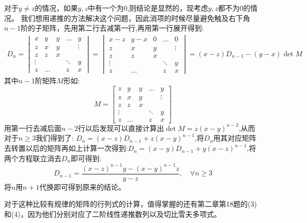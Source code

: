 \documentclass[a4paper,12pt]{ctexart}
\newenvironment{prooff}{{\noindent\it\textcolor{cyan!40!black}{Proof}:}\quad}{\par}
\begin{document}
\begin{prooff}
    对于$y\neq z$的情况，如果$y,z$中有一个为$0$,则结论是显然的，现考虑$y,z$都不为$0$的情况。
    我们想用递推的方法解决这个问题，因此消项的时候尽量避免触及右下角$n-1$阶的子矩阵，先用第二行去减第一行,再用第一行展开得到:
    \begin{align*}
        D_n=\begin{vmatrix}
            x      & y     & y & \dots  & y      \\
            z      & x     & y &        & \vdots \\
            z      & z     & x &        &        \\
            \vdots &       &   & \ddots & y      \\
            z      & \dots &   & z      & x
        \end{vmatrix}=\begin{vmatrix}
            x-z    & y-x   & 0 & \dots  & 0      \\
            z      & x     & y &        & \vdots \\
            z      & z     & x &        &        \\
            \vdots &       &   & \ddots & y      \\
            z      & \dots &   & z      & x
        \end{vmatrix}=(x-z)D_{n-1}-(y-x)\det M
    \end{align*}
    其中$n-1$阶矩阵$M$形如:
    \begin{equation*}
        M=\begin{bmatrix}
            z      & y     & y & \dots  & y      \\
            z      & x     & y &        & \vdots \\
            z      & z     & x &        &        \\
            \vdots &       &   & \ddots & y      \\
            z      & \dots &   & z      & x
        \end{bmatrix}
    \end{equation*}
    用第一行去减后面$n-2$行以后发现可以直接计算出$\det M=z(x-y)^{n-2}$,从而对于$n\ge 3$我们得到了:
    $D_n=(x-z)D_{n-1}+z(x-y)^{n-1}$,将$D_n$用其对应矩阵去转置以后的矩阵再如上计算一次得到:$D_n=(x-y)D_{n-1}+y(x-z)^{n-1}$,将两个方程联立消去$D_n$即可得到:
    \begin{equation*}
        D_{n-1}=\dfrac{(x-z)^{n-1}y-(x-y)^{n-1}z}{y-z},\quad \forall n\ge 3
    \end{equation*}
    将$n$用$n+1$代换即可得到原来的结论。
\end{prooff}
对于这种比较有规律的矩阵的行列式的计算，值得掌握的还有第二章第18题的(3)和(4)，因为他们分别对应了二阶线性递推数列以及切比雪夫多项式。
\end{document}
